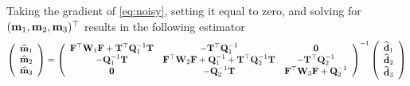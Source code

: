 \documentclass[11pt]{article}
\newcommand{\bfF}	{{\bf{F}}}
\newcommand{\bfI}	{{\bf{I}}}
\newcommand{\bfQ}	{{\bf{Q}}}
\newcommand{\bfT}	{{\bf{T}}}
\newcommand{\bfW}	{{\bf{W}}}
\newcommand{\bfd}	{{\bf{d}}}
\newcommand{\bfm}	{{\bf{m}}}
\newcommand {\zero}  { {\bf 0} }
\newcommand{\bfmhat}    {{\widehat{\bfm}}}
\newcommand{\bfdhat}    {{\widehat{\bfd}}}
\begin{document}
Taking the gradient of \eqref{eq:noisy},
 setting it equal to zero, and solving for $(\bfm_1,  \bfm_2, \bfm_3)^{\top} $ results in the following estimator 
\begin{eqnarray}
\nonumber
\left(\begin{array}{c}  \bfmhat_1  \\ \bfmhat_2 \\ \bfmhat_3 \end{array}\right)=
\left(\begin{array}{ccc}\bfF^{\top}\bfW_1\bfF + \bfT^{\top}\bfQ^{-1}_1\bfT   & -\bfT^{\top}\bfQ^{-1}_1 & \zero\\
 -\bfQ^{-1}_1\bfT & \bfF^{\top}\bfW_2\bfF + \bfQ^{-1}_1 + \bfT^{\top}\bfQ^{-1}_2\bfT  & -\bfT^{\top}\bfQ^{-1}_2\\
 \zero & -\bfQ^{-1}_2\bfT & \bfF^{\top}\bfW_3\bfF + \bfQ^{-1}_2  
 \end{array}\right)^{-1}	
\left(\begin{array}{c}\bfdhat_1  \\  \bfdhat_2 \\
\bfdhat_3 
\end{array}\right)	
\end{eqnarray}
\end{document}
